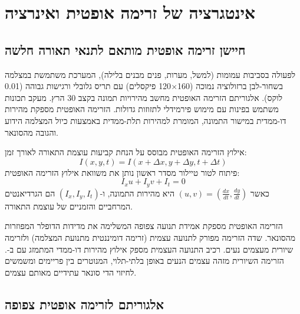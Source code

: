 

\section{אינטגרציה של זרימה אופטית ואינרציה}
\label{sec:ch06_algorithm}

\subsection{חיישן זרימה אופטית מותאם לתנאי תאורה חלשה}
\label{sec:ch06_optical_flow_sensor}

לפעולה בסביבות עמומות (למשל, מערות, פנים מבנים בלילה), המערכת משתמשת במצלמה בשחור-לבן ברזולוציה נמוכה (160$\times$120 פיקסלים) עם תריס גלובלי ורגישות גבוהה (0.01 לוקס). אלגוריתם הזרימה האופטית  מחשב מהירויות תמונה בקצב 30 הרץ. מעקב תכונות משתמש בפינות  עם מימוש פירמידלי לתזוזות גדולות. הזרימה האופטית מספקת מהירות דו-ממדית במישור התמונה, המומרת למהירות תלת-ממדית באמצעות כיול המצלמה הידוע והגובה מהסונאר.

אילוץ הזרימה האופטית מבוסס על הנחת קביעות עוצמת התאורה לאורך זמן:
\begin{equation}
I(x, y, t) = I(x + \Delta x, y + \Delta y, t + \Delta t)
\label{eq:ch06_brightness_constancy}
\end{equation}
פיתוח לטור טיילור מסדר ראשון נותן את משוואת אילוץ הזרימה האופטית:
\begin{equation}
I_x u + I_y v + I_t = 0
\label{eq:ch06_optical_flow_constraint}
\end{equation}
כאשר $(u, v) = (\frac{dx}{dt}, \frac{dy}{dt})$ היא מהירות התמונה, ו-$(I_x, I_y, I_t)$ הם הגרדיאנטים המרחביים והזמניים של עוצמת התאורה.

הזרימה האופטית מספקת אמידת תנועה צפופה המשלימה את מדידות הדופלר המפוזרות מהסונאר. שדה הזרימה מפורק לתנועה עצמית (זרימה דומיננטית מתנועת המצלמה) ולזרימה שיורית מעצמים נעים. רכיב התנועה העצמית מספק אילוץ מהירות דו-ממדי המתמזג עם  ב-. הזרימה השיורית מזהה עצמים הנעים באופן בלתי-תלוי, המנוטרים בין פריימים ומשמשים לחיזוי הדי סונאר עתידיים מאותם עצמים.

\subsection{אלגוריתם  לזרימה אופטית צפופה}
\label{sec:ch06_raft_algorithm}

